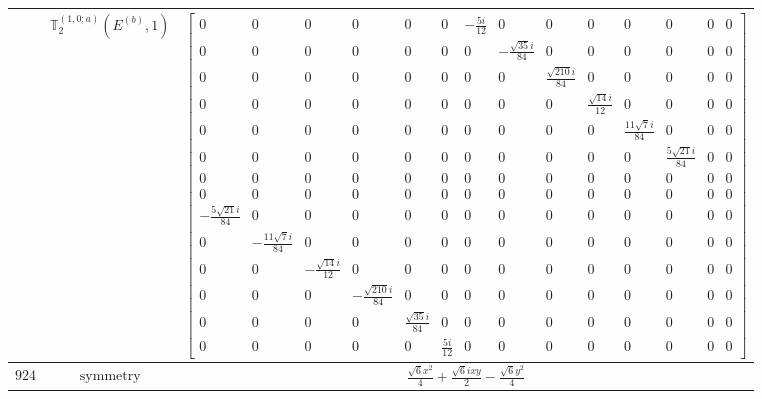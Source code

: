 \documentclass[fleqn,8pt,landscape]{jsarticle}
\begin{document}
\begin{longtable}{ccc}
$  $ & $ \mathbb{T}_{2}^{(1,0;a)}(E^{(b)},1) $ & $ \begin{bmatrix} 0 & 0 & 0 & 0 & 0 & 0 & - \frac{5 i}{12} & 0 & 0 & 0 & 0 & 0 & 0 & 0 \\ 0 & 0 & 0 & 0 & 0 & 0 & 0 & - \frac{\sqrt{35} i}{84} & 0 & 0 & 0 & 0 & 0 & 0 \\ 0 & 0 & 0 & 0 & 0 & 0 & 0 & 0 & \frac{\sqrt{210} i}{84} & 0 & 0 & 0 & 0 & 0 \\ 0 & 0 & 0 & 0 & 0 & 0 & 0 & 0 & 0 & \frac{\sqrt{14} i}{12} & 0 & 0 & 0 & 0 \\ 0 & 0 & 0 & 0 & 0 & 0 & 0 & 0 & 0 & 0 & \frac{11 \sqrt{7} i}{84} & 0 & 0 & 0 \\ 0 & 0 & 0 & 0 & 0 & 0 & 0 & 0 & 0 & 0 & 0 & \frac{5 \sqrt{21} i}{84} & 0 & 0 \\ 0 & 0 & 0 & 0 & 0 & 0 & 0 & 0 & 0 & 0 & 0 & 0 & 0 & 0 \\ 0 & 0 & 0 & 0 & 0 & 0 & 0 & 0 & 0 & 0 & 0 & 0 & 0 & 0 \\ - \frac{5 \sqrt{21} i}{84} & 0 & 0 & 0 & 0 & 0 & 0 & 0 & 0 & 0 & 0 & 0 & 0 & 0 \\ 0 & - \frac{11 \sqrt{7} i}{84} & 0 & 0 & 0 & 0 & 0 & 0 & 0 & 0 & 0 & 0 & 0 & 0 \\ 0 & 0 & - \frac{\sqrt{14} i}{12} & 0 & 0 & 0 & 0 & 0 & 0 & 0 & 0 & 0 & 0 & 0 \\ 0 & 0 & 0 & - \frac{\sqrt{210} i}{84} & 0 & 0 & 0 & 0 & 0 & 0 & 0 & 0 & 0 & 0 \\ 0 & 0 & 0 & 0 & \frac{\sqrt{35} i}{84} & 0 & 0 & 0 & 0 & 0 & 0 & 0 & 0 & 0 \\ 0 & 0 & 0 & 0 & 0 & \frac{5 i}{12} & 0 & 0 & 0 & 0 & 0 & 0 & 0 & 0 \end{bmatrix} $ \\ \hline
$ 924 $ & $ \text{symmetry} $ & $ \frac{\sqrt{6} x^{2}}{4} + \frac{\sqrt{6} i x y}{2} - \frac{\sqrt{6} y^{2}}{4} $ \\

\end{longtable}
\end{document}
